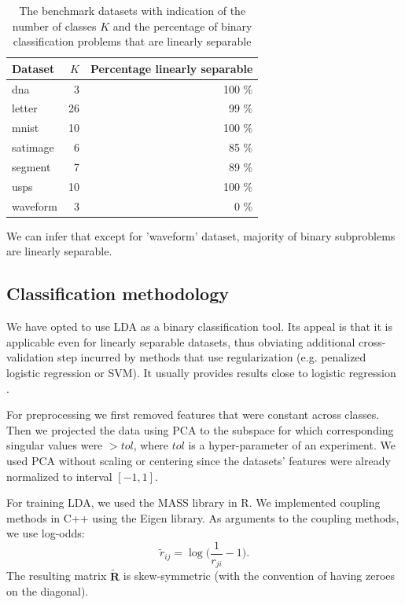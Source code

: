 \documentclass[pdflatex, sn-basic]{sn-jnl}%
\theoremstyle{thmstyleone}%
\theoremstyle{thmstyletwo}%
\theoremstyle{thmstylethree}%
\begin{document}
\begin{table}[ht]
\centering
\begin{tabular}{lrr}
  \hline
Dataset & $K$ & Percentage linearly separable \\ 
  \hline
dna &    3 & 100 \%    \\ 
  letter &   26 & 99 \%    \\ 
  mnist &   10 & 100 \%    \\ 
  satimage &    6 & 85 \%    \\ 
  segment &    7 & 89 \%    \\ 
  usps &   10 & 100 \%    \\ 
  waveform &    3 & 0 \%    \\ 
   \hline
\end{tabular}
\caption{The benchmark datasets with indication of the number of classes $K$ and the percentage of binary classification problems that are linearly separable} 
\label{tab:sep}
\end{table}


We can infer that except for 'waveform' dataset, majority of binary subproblems 
are linearly separable.

\subsection{Classification methodology}

We have opted to use LDA as a binary classification tool. Its appeal is that it 
is applicable even for linearly separable datasets, thus obviating additional 
cross-validation step incurred by methods that use regularization 
(e.g. penalized logistic regression or SVM). It usually provides results close 
to logistic regression \cite{james2013introduction}.

For preprocessing we first removed features that were constant across classes. 
Then we projected the data using PCA to the subspace for which corresponding 
singular values were $> tol$, where $tol$ is a hyper-parameter of an experiment. 
We used PCA without scaling or centering since the datasets' features were 
already normalized to interval $[-1,1]$. 

For training LDA, we used the MASS library in R. We implemented coupling methods in C++ using the Eigen library. As arguments to the coupling methods, we use log-odds:
$$
\tilde r_{ij} = \log \biggl(\frac{1}{r_{ji}} - 1\biggr).
$$
The resulting matrix $\tilde{\boldsymbol{R}}$ is skew-symmetric (with the convention of having zeroes on the diagonal).
\end{document}
